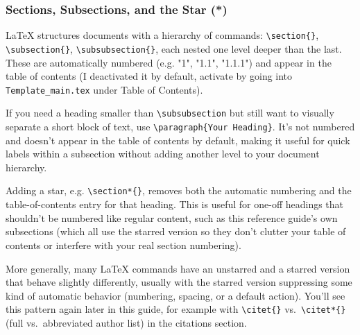 \subsubsection*{Sections, Subsections, and the Star (*)}
LaTeX structures documents with a hierarchy of commands: \verb|\section{}|, \verb|\subsection{}|, \verb|\subsubsection{}|, each nested one level deeper than the last. These are automatically numbered (e.g. "1", "1.1", "1.1.1") and appear in the table of contents (I deactivated it by default, activate by going into \texttt{Template\_main.tex} under Table of Contents).

If you need a heading smaller than \verb|\subsubsection| but still want to visually separate a short block of text, use \verb|\paragraph{Your Heading}|. It's not numbered and doesn't appear in the table of contents by default, making it useful for quick labels within a subsection without adding another level to your document hierarchy.

Adding a star, e.g. \verb|\section*{}|, removes both the automatic numbering and the table-of-contents entry for that heading. This is useful for one-off headings that shouldn't be numbered like regular content, such as this reference guide's own subsections (which all use the starred version so they don't clutter your table of contents or interfere with your real section numbering).

More generally, many LaTeX commands have an unstarred and a starred version that behave slightly differently, usually with the starred version suppressing some kind of automatic behavior (numbering, spacing, or a default action). You'll see this pattern again later in this guide, for example with \verb|\citet{}| vs.\ \verb|\citet*{}| (full vs.\ abbreviated author list) in the citations section. 

